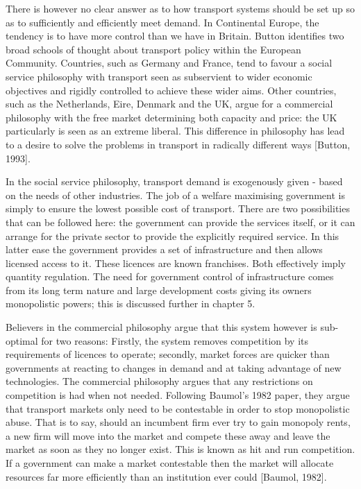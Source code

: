 There is however no clear answer as to how transport systems should be set up so as to sufficiently and efficiently meet demand. In Continental Europe, the tendency is to have more control than we have in Britain. Button identifies two broad schools of thought about transport policy within the European Community. Countries, such as Germany and France, tend to favour a social service philosophy with transport seen as subservient to wider economic objectives and rigidly controlled to achieve these wider aims. Other countries, such as the Netherlands, Eire, Denmark and the UK, argue for a commercial philosophy with the free market determining both capacity and price: the UK particularly is seen as an extreme liberal. This difference in philosophy has lead to a desire to solve the problems in transport in radically different ways [Button, 1993].

In the social service philosophy, transport demand is exogenously given - based on the needs of other industries. The job of a welfare maximising government is simply to ensure the lowest possible cost of transport. There are two possibilities that can be followed here: the government can provide the services itself, or it can arrange for the private sector to provide the explicitly required service. In this latter ease the government provides a set of infrastructure and then allows licensed access to it. These licences are known franchises. Both effectively imply quantity regulation. The need for government control of infrastructure comes from its long term nature and large development costs giving its owners monopolistic powers; this is discussed further in chapter 5.

Believers in the commercial philosophy argue that this system however is sub-optimal for two reasons: Firstly, the system removes competition by its requirements of licences to operate; secondly, market forces are quicker than governments at reacting to changes in demand and at taking advantage of new technologies. The commercial philosophy argues that any restrictions on competition is had when not needed. Following Baumol's 1982 paper, they argue that transport markets only need to be contestable in order to stop monopolistic abuse. That is to say, should an incumbent firm ever try to gain monopoly rents, a new firm will move into the market and compete these away and leave the market as soon as they no longer exist. This is known as hit and run competition. If a government can make a market contestable then the market will allocate resources far more efficiently than an institution ever could [Baumol, 1982].

